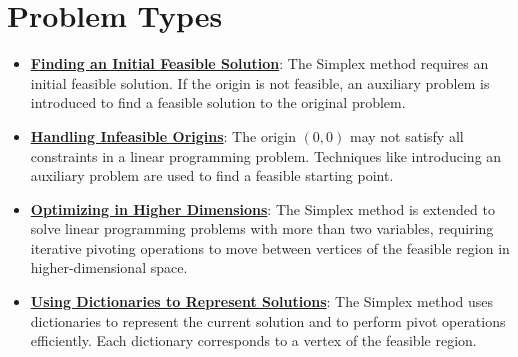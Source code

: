 \documentclass{article}%
\begin{document}
\section{Problem Types}%
\label{sec:ProblemTypes}%
\begin{itemize}[leftmargin=*]%
\item \href{https://www.math.purdue.edu/~yipn/421/2024-08-27-ExSimplex.pdf#page=32}{\textbf{Finding an Initial Feasible Solution}}: The Simplex method requires an initial feasible solution. If the origin is not feasible, an auxiliary problem is introduced to find a feasible solution to the original problem.%
\item \href{https://www.math.purdue.edu/~yipn/421/2024-08-27-ExSimplex.pdf#page=30}{\textbf{Handling Infeasible Origins}}: The origin $(0, 0)$ may not satisfy all constraints in a linear programming problem. Techniques like introducing an auxiliary problem are used to find a feasible starting point.%
\item \href{https://www.math.purdue.edu/~yipn/421/2024-08-27-ExSimplex.pdf#page=17}{\textbf{Optimizing in Higher Dimensions}}: The Simplex method is extended to solve linear programming problems with more than two variables, requiring iterative pivoting operations to move between vertices of the feasible region in higher-dimensional space.%
\item \href{https://www.math.purdue.edu/~yipn/421/2024-08-27-ExSimplex.pdf#page=26}{\textbf{Using Dictionaries to Represent Solutions}}: The Simplex method uses dictionaries to represent the current solution and to perform pivot operations efficiently. Each dictionary corresponds to a vertex of the feasible region.%
\end{itemize}%
\end{document}
